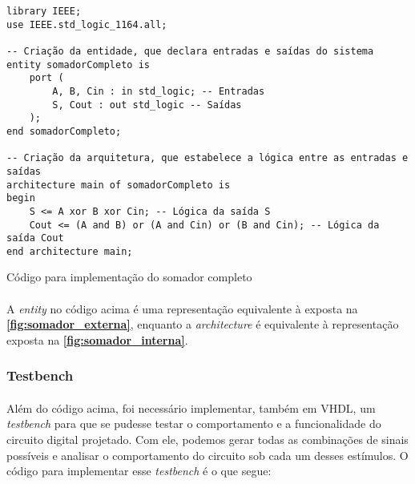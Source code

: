 \documentclass[a4paper,12pt]{article}
\newenvironment{code}{\captionsetup{type=listing}}{}
\begin{document}
\begin{code}
\begin{verbatim}
library IEEE;
use IEEE.std_logic_1164.all;

-- Criação da entidade, que declara entradas e saídas do sistema
entity somadorCompleto is
    port (
        A, B, Cin : in std_logic; -- Entradas
        S, Cout : out std_logic -- Saídas
    );
end somadorCompleto;

-- Criação da arquitetura, que estabelece a lógica entre as entradas e saídas
architecture main of somadorCompleto is
begin
    S <= A xor B xor Cin; -- Lógica da saída S
    Cout <= (A and B) or (A and Cin) or (B and Cin); -- Lógica da saída Cout
end architecture main;
\end{verbatim}
\caption{Código para implementação do somador completo}
\end{code}

\paragraph{}
A \textit{entity} no código acima é uma representação equivalente à exposta na \textbf{\autoref{fig:somador_externa}}, enquanto a \textit{architecture} é equivalente à representação exposta na \textbf{\autoref{fig:somador_interna}}.

\subsubsection{Testbench}
\paragraph{}
Além do código acima, foi necessário implementar, também em VHDL, um \textit{testbench} para que se pudesse testar o comportamento e a funcionalidade do circuito digital projetado. Com ele, podemos gerar todas as combinações de sinais possíveis e analisar o comportamento do circuito sob cada um desses estímulos. O código para implementar esse \textit{testbench} é o que segue:
\end{document}
